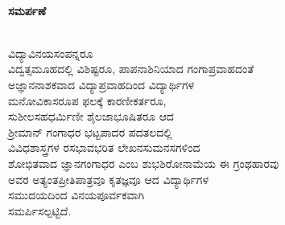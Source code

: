 \thispagestyle{empty}
~
\vfill
\begin{mdframed}[roundcorner=10pt]
\phantom{i}
\smallskip
{}
\centering
{\Large\bfseries ಸಮರ್ಪಣೆ}
\smallskip
{}\\
ವಿದ್ಯಾವಿನಯಸಂಪನ್ನರೂ \\ವಿದ್ವತ್ಸಮೂಹದಲ್ಲಿ ವಿಶಿಷ್ಟರೂ, ಪಾಪನಾಶಿನಿಯಾದ ಗಂಗಾಪ್ರವಾಹದಂತೆ \\ಅಜ್ಞಾನನಾಶಕವಾದ ವಿದ್ಯಾಪ್ರವಾಹದಿಂದ
ವಿದ್ಯಾರ್ಥಿಗಳ \\ಮನೋವಿಕಾಸರೂಪ ಫಲಕ್ಕೆ  ಕಾರಣೀಕರ್ತರೂ, \\
ಸುಶೀಲಸಹಧರ್ಮಿಣೀ ಶೈಲಜಾಭೂಷಿತರೂ ಆದ \\ಶ್ರೀಮಾನ್ ಗಂಗಾಧರ
ಭಟ್ಟಪಾದರ ಪದತಲದಲ್ಲಿ \\ವಿವಿಧಶಾಸ್ತ್ರಗಳ ರಸಭಾವಭರಿತ ಲೇಖನಸುಮನಸಗಳಿಂದ\\
ಶೋಭಿತವಾದ ಜ್ಞಾನಗಂಗಾಧರ ಎಂಬ ಶುಭಶಿರೋನಾಮೆಯ ಈ ಗ್ರಂಥಹಾರವು\\
ಅವರ ಅತ್ಯಂತಪ್ರೀತಿಪಾತ್ರವೂ ಕೃತಜ್ಞವೂ ಆದ ವಿದ್ಯಾರ್ಥಿಗಳ\\
ಸಮುದಯದಿಂದ ವಿನಯಪೂರ್ವಕವಾಗಿ\\
ಸಮರ್ಪಿಸಲ್ಪಟ್ಟಿದೆ.
\bigskip
\phantom{i}
\end{mdframed}
\vfill

